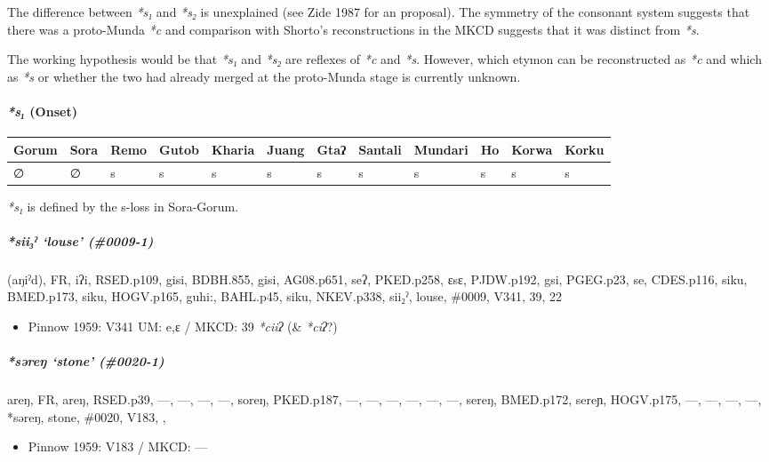 \documentclass[a4paper,]{article}
\providecommand{\tightlist}{%
  \setlength{\itemsep}{0pt}\setlength{\parskip}{0pt}}
\let\oldparagraph\paragraph
\renewcommand{\paragraph}[1]{\oldparagraph{#1}\mbox{}}
\let\oldsubparagraph\subparagraph
\renewcommand{\subparagraph}[1]{\oldsubparagraph{#1}\mbox{}}
\begin{document}
The difference between \emph{*s₁} and \emph{*s₂} is unexplained (see
Zide 1987 for an proposal). The symmetry of the consonant system
suggests that there was a proto-Munda \emph{*c} and comparison with
Shorto's reconstructions in the MKCD suggests that it was distinct from
\emph{*s}.

The working hypothesis would be that \emph{*s₁} and \emph{*s₂} are
reflexes of \emph{*c} and \emph{*s}. However, which etymon can be
reconstructed as \emph{*c} and which as \emph{*s} or whether the two had
already merged at the proto-Munda stage is currently unknown.

\paragraph{\texorpdfstring{\emph{*s₁}
(Onset)}{*s₁ (Onset)}}\label{s-onset}

\begin{longtable}[]{@{}llllllllllll@{}}
\toprule
Gorum & Sora & Remo & Gutob & Kharia & Juang & Gtaʔ & Santali & Mundari
& Ho & Korwa & Korku\tabularnewline
\midrule
\endhead
∅ & ∅ & s & s & s & s & s & s & s & s & s & s\tabularnewline
\bottomrule
\end{longtable}

\emph{*s₁} is defined by the s-loss in Sora-Gorum.

\subparagraph{\texorpdfstring{\emph{*sii₃ˀ} `louse'
(\#0009-1)}{*sii₃ˀ louse (\#0009-1)}}\label{siiux2c0-louse-0009-1}

(aŋiˀd), FR, iʔi, RSED.p109, gisi, BDBH.855, gisi, AG08.p651, seʔ,
PKED.p258, ɛsɛ, PJDW.p192, gsi, PGEG.p23, se, CDES.p116, siku,
BMED.p173, siku, HOGV.p165, guhi:, BAHL.p45, siku, NKEV.p338, sii₂ˀ,
louse, \#0009, V341, 39, 22

\begin{itemize}
\tightlist
\item
  Pinnow 1959: V341 UM: e,ɛ / MKCD: 39 \emph{*ciiʔ} (\& \emph{*ciʔ}?)
\end{itemize}

\subparagraph{\texorpdfstring{\emph{*səreŋ} `stone'
(\#0020-1)}{*səreŋ stone (\#0020-1)}}\label{sux259reux14b-stone-0020-1}

areŋ, FR, areŋ, RSED.p39, ---, ---, ---, ---, soreŋ, PKED.p187, ---,
---, ---, ---, ---, ---, sereŋ, BMED.p172, sereɲ, HOGV.p175, ---, ---,
---, ---, *səreŋ, stone, \#0020, V183, ,

\begin{itemize}
\tightlist
\item
  Pinnow 1959: V183 / MKCD: ---
\end{itemize}
\end{document}
